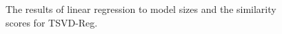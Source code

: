 \documentclass[letterpaper]{article} %
\begin{document}
\begin{figure}[t]
	\centering
	\caption{The results of linear regression to model sizes and the similarity scores for TSVD-Reg.}
	\label{Fig.model_size_compare_reg}
\end{figure}
\end{document}
